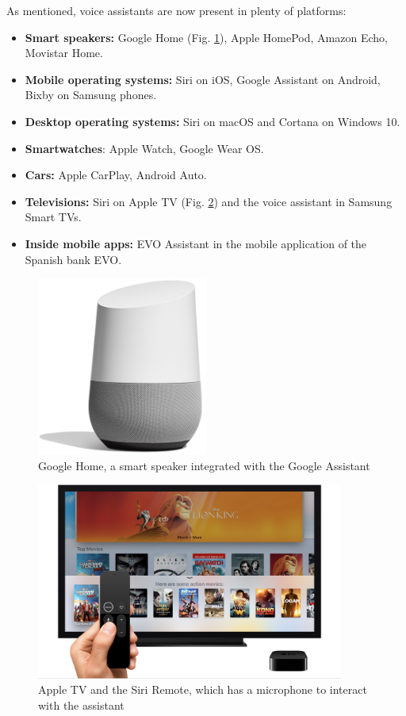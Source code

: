As mentioned, voice assistants are now present in plenty of platforms:
\begin{itemize}
	\item \textbf{Smart speakers:} Google Home (Fig. \ref{fig:google-home}), Apple HomePod, Amazon Echo, Movistar Home.
	\item \textbf{Mobile operating systems:} Siri on iOS, Google Assistant on Android, Bixby on Samsung phones.
	\item \textbf{Desktop operating systems:} Siri on macOS and Cortana on Windows 10.
	\item \textbf{Smartwatches}: Apple Watch, Google Wear OS.
	\item \textbf{Cars:} Apple CarPlay, Android Auto.
	\item \textbf{Televisions:} Siri on Apple TV (Fig. \ref{fig:apple-tv}) and the voice assistant in Samsung Smart TVs.
	\item \textbf{Inside mobile apps:} EVO Assistant in the mobile application of the Spanish bank EVO.
\end{itemize}

\begin{figure}
	\centering
	\includegraphics[width=0.5\textwidth]{images/Chapter_04/google-home.png}
	\caption{Google Home, a smart speaker integrated with the Google Assistant}
	\label{fig:google-home}
\end{figure}

\begin{figure}
	\centering
	\includegraphics[width=0.9\textwidth]{images/Chapter_04/apple-tv.jpg}
	\caption{Apple TV and the Siri Remote, which has a microphone to interact with the assistant}
	\label{fig:apple-tv}
\end{figure}


